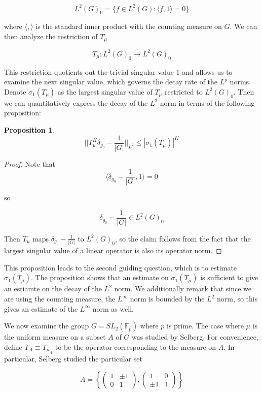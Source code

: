\documentclass[12pt]{amsart}
\newtheorem{prop}[theorem]{Proposition}
\begin{document}
\[L^2(G)_0 = \{ f\in L^2(G): \langle f, 1\rangle = 0\}\] 

where $\langle ,\rangle$ is the standard inner product with the counting measure on $G$. We can then analyze the restriction of $T_\mu$ 

\[ T_\mu: L^2(G)_0 \to L^2(G)_0\] 

This restriction quotients out the trivial singular value 1 and allows us to examine the next singular value, which governs the decay rate of the $L^p$ norms. Denote $\sigma_1(T_\mu)$ as the largest singular value of $T_\mu$ restricted to $L^2(G)_0$. Then we can quantitatively express the decay of the $L^2$ norm in terms of the following proposition: 

\begin{prop}
\[ ||T_\mu^K \delta_{g_0} - \frac{1}{|G|} ||_{L^2} \leq |\sigma_1(T_\mu)|^K \]
\label{l2_sigma_1}
\end{prop}
\begin{proof}
Note that $$\langle \delta_{g_0} - \frac{1}{|G|}, 1\rangle = 0$$ 

so 

$$\delta_{g_0} - \frac{1}{|G|} \in L^2(G)_0$$ 

Then $T_\mu$ maps $\delta_{g_0} - \frac{1}{|G|} $ to $L^2(G)_0$, so the claim follows from the fact that the largest singular value of a linear operator is also its operator norm. 
\end{proof} 

This proposition leads to the second guiding question, which is to estimate $\sigma_1(T_\mu)$. The proposition shows that an estimate on $\sigma_1(T_\mu)$ is sufficient to give an estiamte on the decay of the $L^2$ norm. We additionally remark that since we are using the counting measure, the $L^\infty$ norm is bounded by the $L^2$ norm, so this gives an estimate of the $L^\infty$ norm as well. 

We now examine the group $G = SL_2(\mathbb{F}_p)$ where $p$ is prime. The case where $\mu$ is the uniform measure on a subset $A$ of $G$ was studied by Selberg. For convenience, define $T_A \equiv T_{\mu_A}$ to be the operator corresponding to the measure on $A$. In particular, Selberg studied the particular set 

\[A = \left\{ \begin{pmatrix}
    1 & \pm 1\\
    0 & 1
\end{pmatrix}, \begin{pmatrix}
    1 & 0\\
    \pm 1 & 1
\end{pmatrix}\right\}\]
\end{document}
